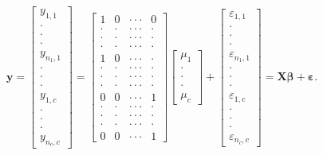 \begin{equation}\label{E4:MatrixOneFactor}
\mathbf{y}=
\begin{bmatrix}
y_{1,1} \\
\cdot  \\
\cdot  \\
\cdot  \\
y_{n_1,1} \\
\cdot  \\
\cdot  \\
\cdot  \\
y_{1,c} \\
\cdot  \\
\cdot  \\
\cdot  \\
y_{n_{c},c}%
\end{bmatrix}
=
\begin{bmatrix}
1 & 0 & \cdot \cdot \cdot  & 0 \\
\cdot  & \cdot  & \cdot \cdot \cdot  & \cdot  \\
\cdot  & \cdot  & \cdot \cdot \cdot  & \cdot  \\
\cdot  & \cdot  & \cdot \cdot \cdot  & \cdot  \\
1 & 0 & \cdot \cdot \cdot  & \cdot  \\
\cdot  & \cdot  & \cdot \cdot \cdot  & \cdot  \\
\cdot  & \cdot  & \cdot \cdot \cdot  & \cdot  \\
\cdot  & \cdot  & \cdot \cdot \cdot  & \cdot  \\
0 & 0 & \cdot \cdot \cdot  & 1 \\
\cdot  & \cdot  & \cdot \cdot \cdot  & \cdot  \\
\cdot  & \cdot  & \cdot \cdot \cdot  & \cdot  \\
\cdot  & \cdot  & \cdot \cdot \cdot  & \cdot  \\
0 & 0 & \cdot \cdot \cdot  & 1%
\end{bmatrix}%
\begin{bmatrix}
\mu_1 \\
\cdot  \\
\cdot  \\
\cdot  \\
\mu_c
\end{bmatrix}
+
\begin{bmatrix}
\varepsilon_{1,1} \\
\cdot  \\
\cdot  \\
\cdot  \\
\varepsilon_{n_1,1} \\
\cdot  \\
\cdot  \\
\cdot  \\
\varepsilon_{1,c} \\
\cdot  \\
\cdot  \\
\cdot  \\
\varepsilon_{n_{c},c}
\end{bmatrix}
=\mathbf{X} \boldsymbol \beta + \boldsymbol \varepsilon .
\end{equation}
